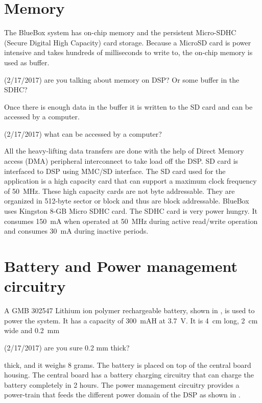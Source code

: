 \section{Memory}
\label{memory}

The BlueBox system has on-chip memory and the persistent Micro-SDHC
(Secure Digital High Capacity) card storage. Because a MicroSD
card is power intensive and takes hundreds of milliseconds to write
to, the on-chip memory is used as buffer.
\begin{cmtPai}
	(2/17/2017) are you talking about memory on DSP? Or some buffer in
	the SDHC?
\end{cmtPai}
Once there is enough data in the buffer it is written to the SD card
and can be accessed by a computer.
\begin{cmtPai}
	(2/17/2017) what can be accessed by a computer?
\end{cmtPai}
All the heavy-lifting data transfers are done with the help of Direct
Memory access (DMA) peripheral interconnect to take load off the DSP.
SD card is interfaced to DSP using MMC/SD interface. The SD card used
for the application is a high capacity card that can support a
maximum clock frequency of 50~MHz. These high capacity cards are not
byte addressable. They are organized in 512-byte sector or block and
thus are block addressable. BlueBox uses Kingston 8-GB Micro SDHC
card.  The SDHC card is very power hungry. It consumes 150~mA when
operated at 50~MHz during active read/write operation and consumes
30~mA during inactive periods.

\section{Battery and Power management circuitry}

A GMB 302547 Lithium ion polymer rechargeable battery, shown in
, is used to power the system. It has a
capacity of 300~mAH at 3.7~V. It is 4~cm long, 2~cm wide and 0.2~mm
\begin{cmtPai}
	(2/17/2017) are you sure 0.2 mm thick?
\end{cmtPai}
thick, and it weighs 8 grams. The battery is placed on top of the
central board housing. The central board has a battery charging
circuitry that can charge the battery completely in 2 hours. The
power management circuitry provides a power-train that feeds the
different power domain of the DSP as shown in
.

